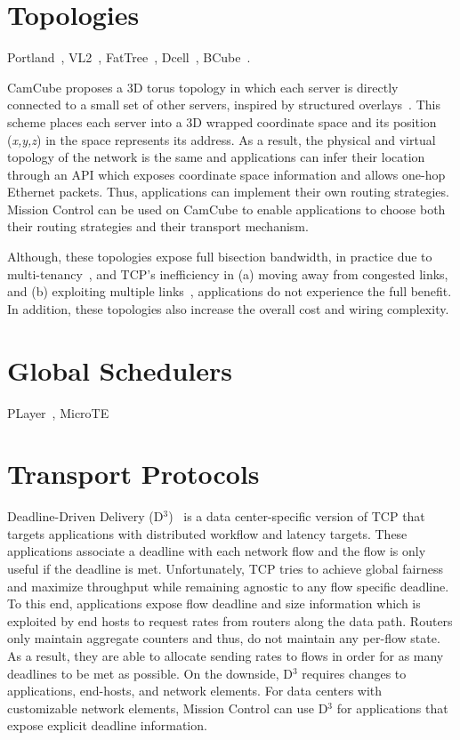 \documentclass[a4paper,12pt,twoside,openright]{report}
\begin{document}
\section{Topologies}
Portland~\cite{NiranjanMysore:2009:PSF}, VL2~\cite{Greenberg:2009:VSF},
FatTree~\cite{Al-Fares:2008:SCD}, Dcell~\cite{Guo:2008:DSF},
BCube~\cite{Guo:2009:BHP}.

CamCube proposes a 3D torus topology in which each server is directly connected
to a small set of other servers, inspired by structured
overlays~\cite{Abu-Libdeh:2010:SRF}. This scheme places each server into a 3D
wrapped coordinate space and its position (\emph{x,y,z}) in the space represents
its address. As a result, the physical and virtual topology of the network is
the same and applications can infer their location through an API which exposes
coordinate space information and allows one-hop Ethernet packets. Thus,
applications can implement their own routing strategies. Mission Control can be
used on CamCube to enable applications to choose both their routing strategies
and their transport mechanism.

Although, these topologies expose full bisection bandwidth, in practice due to
multi-tenancy~\cite{Costa:2012:CEI}, and TCP's inefficiency in (a) moving away
from congested links, and (b) exploiting multiple links~\cite{Raiciu:2011:IDP},
applications do not experience the full benefit. In addition, these topologies
also increase the overall cost and wiring complexity.

\section{Global Schedulers}
PLayer~\cite{Joseph:2008:PSL}, MicroTE~\cite{Benson:2011:MFG}

\section{Transport Protocols}
Deadline-Driven Delivery (D$^3$)~\cite{Wilson:2011:BNL} is a data
center-specific version of TCP that targets applications with distributed
workflow and latency targets. These applications associate a deadline with each
network flow and the flow is only useful if the deadline is met. Unfortunately,
TCP tries to achieve global fairness and maximize throughput while remaining
agnostic to any flow specific deadline. To this end, applications expose flow
deadline and size information which is exploited by end hosts to request rates
from routers along the data path. Routers only maintain aggregate counters and
thus, do not maintain any per-flow state. As a result, they are able to allocate
sending rates to flows in order for as many deadlines to be met as possible. On
the downside, D$^3$ requires changes to applications, end-hosts, and network
elements. For data centers with customizable network elements, Mission Control
can use D$^3$ for applications that expose explicit deadline information.
\end{document}
